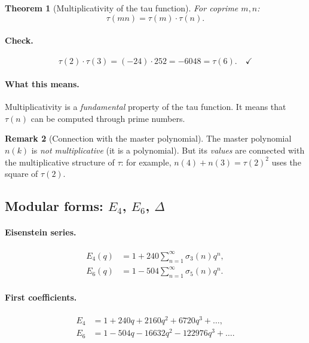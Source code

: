 \documentclass[11pt,a4paper]{article}
\newtheorem{theorem}{Theorem}[section]
\theoremstyle{definition}
\newtheorem{remark}[theorem]{Remark}
\begin{document}
\begin{theorem}[Multiplicativity of the tau function]
\label{thm:tau-multiplicative}
For coprime $m, n$:
\begin{equation}
    \tau(mn) = \tau(m) \cdot \tau(n).
\end{equation}
\end{theorem}

\paragraph{Check.}
\begin{equation}
    \tau(2) \cdot \tau(3) = (-24) \cdot 252 = -6048 
    = \tau(6). \quad \checkmark
\end{equation}

\paragraph{What this means.}
Multiplicativity is a \emph{fundamental} property of the 
tau function. It means that $\tau(n)$ can be computed 
through prime numbers.

\begin{remark}[Connection with the master polynomial]
\label{rem:master-tau-multiplicative}
The master polynomial $n(k)$ is \emph{not multiplicative} (it is a 
polynomial). But its \emph{values} are connected with the multiplicative 
structure of $\tau$: for example, $n(4) + n(3) = \tau(2)^2$ 
uses the square of $\tau(2)$.
\end{remark}

\subsection{Modular forms: $E_4$, $E_6$, $\Delta$}
\label{subsec:modular-forms}

\paragraph{Eisenstein series.}
\begin{align}
    E_4(q) &= 1 + 240 \sum_{n=1}^{\infty} \sigma_3(n) q^n, \\
    E_6(q) &= 1 - 504 \sum_{n=1}^{\infty} \sigma_5(n) q^n.
\end{align}

\paragraph{First coefficients.}
\begin{align}
    E_4 &= 1 + 240 q + 2160 q^2 + 6720 q^3 + \ldots, \\
    E_6 &= 1 - 504 q - 16632 q^2 - 122976 q^3 + \ldots.
\end{align}
\end{document}

